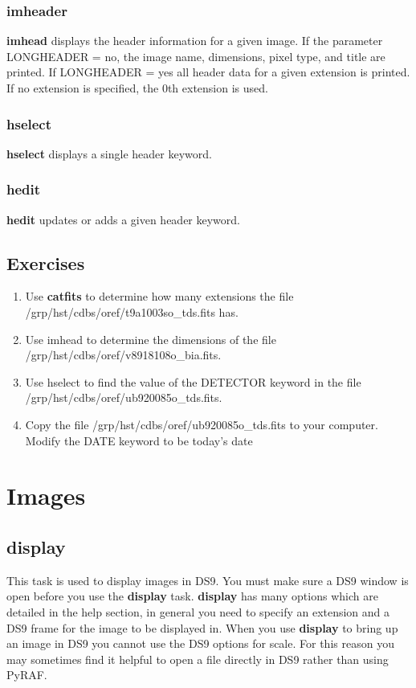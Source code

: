 \subsubsection{{\bf imheader}}
{\bf imhead} displays the header information for a given image. If the parameter LONGHEADER = no, the image name, dimensions, pixel type, and title are printed. If LONGHEADER = yes all header data for a given extension is printed. If no extension is specified, the 0th extension is used.
\subsubsection{{\bf hselect}}
{\bf hselect} displays a single header keyword. 
\subsubsection{{\bf hedit}}
{\bf hedit} updates or adds a given header keyword.

\subsection{Exercises}
\begin{enumerate}
\item Use {\bf catfits} to determine how many extensions the file /grp/hst/cdbs/oref/t9a1003so\_tds.fits has. 
\item Use imhead to determine the dimensions of the file /grp/hst/cdbs/oref/v8918108o\_bia.fits. 
\item Use hselect to find the value of the DETECTOR keyword in the file \\ /grp/hst/cdbs/oref/ub920085o\_tds.fits.
\item Copy the file /grp/hst/cdbs/oref/ub920085o\_tds.fits to your computer. Modify the DATE keyword to be today's date
\end{enumerate}

\section{Images}
\subsection{{\bf display}}
This task is used to display images in DS9. You must make sure a DS9 window is open before you use the {\bf display} task. {\bf display} has many options which are detailed in the help section, in general you need to specify an extension and a DS9 frame for the image to be displayed in. When you use {\bf display} to bring up an image in DS9 you cannot use the DS9 options for scale. For this reason you may sometimes find it helpful to open a file directly in DS9 rather than using PyRAF.

